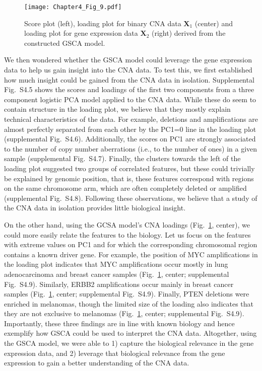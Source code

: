 \begin{figure}[htbp]
    \centering
    \texttt{[image: Chapter4\_Fig\_9.pdf]}
    \caption{Score plot (left), loading plot for binary CNA data $\mathbf{X}_1$ (center) and loading plot for gene expression data $\mathbf{X}_2$ (right) derived from the constructed GSCA model.}
    \label{chapter4_fig:9}
\end{figure}

We then wondered whether the GSCA model could leverage the gene expression data to help us gain insight into the CNA data. To test this, we first established how much insight could be gained from the CNA data in isolation. Supplemental Fig.~S4.5 shows the scores and loadings of the first two components from a three component logistic PCA model \cite{de2006principal} applied to the CNA data. While these do seem to contain structure in the loading plot, we believe that they mostly explain technical characteristics of the data. For example, deletions and amplifications are almost perfectly separated from each other by the PC1=0 line in the loading plot (supplemental Fig.~S4.6). Additionally, the scores on PC1 are strongly associated to the number of copy number aberrations (i.e., to the number of ones) in a given sample (supplemental Fig.~S4.7). Finally, the clusters towards the left of the loading plot suggested two groups of correlated features, but these could trivially be explained by genomic position, that is, these features correspond with regions on the same chromosome arm, which are often completely deleted or amplified (supplemental Fig.~S4.8). Following these observations, we believe that a study of the CNA data in isolation provides little biological insight.

On the other hand, using the GCSA model’s CNA loadings (Fig.~\ref{chapter4_fig:9}, center), we could more easily relate the features to the biology. Let us focus on the features with extreme values on PC1 and for which the corresponding chromosomal region contains a known driver gene. For example, the position of MYC amplifications in the loading plot indicates that MYC amplifications occur mostly in lung adenocarcinoma and breast cancer samples (Fig.~\ref{chapter4_fig:9}, center; supplemental Fig.~S4.9). Similarly, ERBB2 amplifications occur mainly in breast cancer samples (Fig.~\ref{chapter4_fig:9}, center; supplemental Fig.~S4.9). Finally, PTEN deletions were enriched in melanomas, though the limited size of the loading also indicates that they are not exclusive to melanomas (Fig.~\ref{chapter4_fig:9}, center; supplemental Fig.~S4.9). Importantly, these three findings are in line with known biology \cite{akbani2015genomic,cancer2014comprehensive,cancer2012comprehensive} and hence exemplify how GSCA could be used to interpret the CNA data. Altogether, using the GSCA model, we were able to 1) capture the biological relevance in the gene expression data, and 2) leverage that biological relevance from the gene expression to gain a better understanding of the CNA data.

